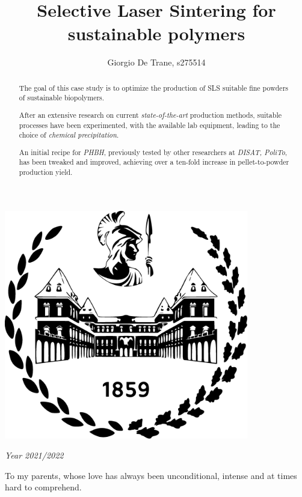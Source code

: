 \documentclass{article}
\author{Giorgio De Trane, s275514}
\title{\textbf{Selective Laser Sintering for sustainable polymers}}
\begin{document}
    \setlength{\parindent}{0pt}
    \maketitle
    \begin{center}
        \includegraphics[width=0.8\textwidth]{Pictures/polito_logo.eps}\linebreak\newline
        
        \textit{Year 2021/2022}
    \end{center}

    \newpage
    \begin{center}
        To my parents, whose love has always been unconditional, intense and at times hard to comprehend. 
    \end{center}
    \newpage


%
    \begin{abstract}
        The goal of this case study is to optimize the production of SLS suitable fine powders of sustainable biopolymers. 

        After an extensive research on current \textit{state-of-the-art} production methods, suitable processes have been experimented, 
        with the available lab equipment, leading to the choice of \textit{chemical precipitation}. 

        An initial recipe for \textit{PHBH}, previously tested by other researchers at \textit{DISAT, PoliTo}, has been tweaked and improved, 
        achieving over a ten-fold increase in pellet-to-powder production yield. 

    \end{abstract}
    \newpage
    \tableofcontents
    \newpage 
    \listoffigures
    \newpage
    \listoftables
    \newpage
\end{document}
